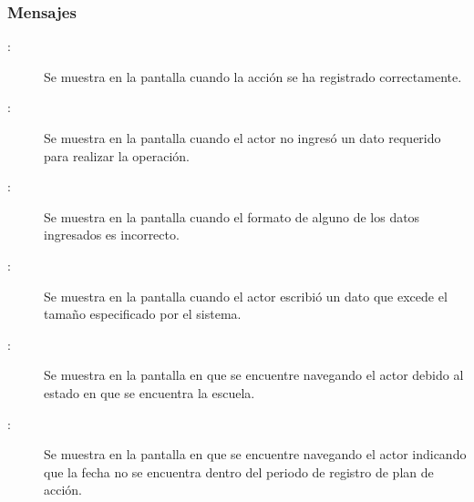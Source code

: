 \subsubsection{Mensajes}

\begin{description}
	\item[:] Se muestra en la pantalla  cuando la acción se ha registrado correctamente.
	\item[:] Se muestra en la pantalla  cuando el actor no ingresó un dato requerido para realizar la operación.
	\item[:] Se muestra en la pantalla  cuando el formato de alguno de los datos ingresados es incorrecto.	
	\item[:] Se muestra en la pantalla  cuando el actor escribió un dato que excede el tamaño especificado por el sistema.
	\item[:] Se muestra en la pantalla en que se encuentre navegando el actor debido al estado en que se encuentra la escuela.	
	\item[:] Se muestra en la pantalla en que se encuentre navegando el actor indicando que la fecha no se encuentra dentro del periodo de registro de plan de acción.	
	\end{description}

